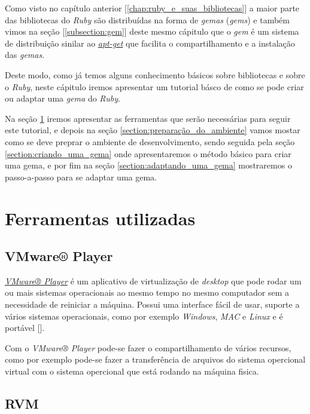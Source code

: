 Como visto no capítulo anterior [\ref{chap:ruby_e_suas_bibliotecas}] a maior parte das bibliotecas do 
\emph{Ruby} são distribuídas na forma de \emph{gemas} (\emph{gems}) e também vimos na seção 
[\ref{subsection:gem}] deste mesmo cápitulo que o \emph{gem} é um sistema de distribuição sinilar ao 
\emph{\href{https://packages.qa.debian.org/a/apt.html}{apt-get}} que facilita o compartilhamento e a 
instalação das \emph{gemas}. 

Deste modo, como já temos alguns conhecimento básicos sobre bibliotecas e sobre o \emph{Ruby}, neste cápitulo 
iremos apresentar um tutorial básco de como se pode criar ou adaptar uma \emph{gema} do \emph{Ruby}.

Na seção \ref{section:ferramentas_utilizadas} iremos apresentar as ferramentas que serão necessárias 
para seguir este tutorial, e depois na seção \ref{section:preparação_do_ambiente} vamos mostar como se 
deve preprar o ambiente de desenvolvimento, sendo seguida pela seção \ref{section:criando_uma_gema} onde
apresentaremos o método básico para criar uma gema, e por fim na seção \ref{section:adaptando_uma_gema}
mostraremos o passo-a-passo para se adaptar uma gema.

\section{Ferramentas utilizadas}
\label{section:ferramentas_utilizadas}

\subsection{VMware® Player}

\emph{\href{http://www.vmware.com/products/player}{VMware® Player}} é um aplicativo de virtualização de 
\emph{desktop} que pode rodar um ou mais sistemas operacionais ao mesmo tempo no mesmo computador sem 
a necessidade de reiniciar a máquina. Possui uma interface fácil de usar, suporte a vários sistemas 
operacionais, como por exemplo \emph{Windows}, \emph{MAC} e \emph{Linux} e é portável 
[].

Com o \emph{VMware® Player} pode-se fazer o compartilhamento de vários recursos, como por exemplo pode-se 
fazer a transferência de arquivos do sistema opercional virtual com o sistema opercional que está rodando 
na máquina fisica. 

\subsection{RVM}

